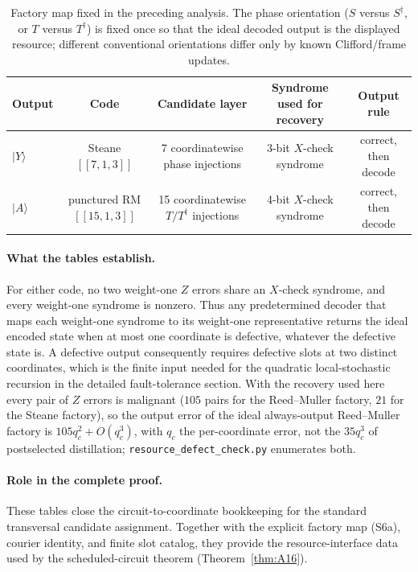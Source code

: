 \documentclass[aps,prx,reprint,superscriptaddress,nofootinbib,floatfix,longbibliography]{revtex4-2}
\theoremstyle{definition}
\begin{document}
\begin{table}[t]
\caption{Factory map fixed in the preceding analysis.  The phase orientation ($S$ versus $S^\dagger$, or $T$ versus $T^\dagger$) is fixed once so that the ideal decoded output is the displayed resource; different conventional orientations differ only by known Clifford/frame updates.}
\label{tab:factory-map}
\centering
\begin{tabular}{@{}l c c c c@{}}
\toprule
Output & Code & Candidate layer & Syndrome used for recovery & Output rule \\
\midrule
$|Y\rangle$ & Steane $[[7,1,3]]$ & 7 coordinatewise phase injections & 3-bit $X$-check syndrome & correct, then decode \\
$|A\rangle$ & punctured RM $[[15,1,3]]$ & 15 coordinatewise $T/T^\dagger$ injections & 4-bit $X$-check syndrome & correct, then decode \\
\bottomrule
\end{tabular}
\end{table}

\paragraph{What the tables establish.}
For either code, no two weight-one $Z$ errors share an $X$-check syndrome, and every weight-one syndrome is nonzero.  Thus any predetermined decoder that maps each weight-one syndrome to its weight-one representative returns the ideal encoded state when at most one coordinate is defective, whatever the defective state is.  A defective output consequently requires defective slots at two distinct coordinates, which is the finite input needed for the quadratic local-stochastic recursion in the detailed fault-tolerance section.  With the recovery used here every pair of $Z$ errors is malignant ($105$ pairs for the Reed--Muller factory, $21$ for the Steane factory), so the output error of the ideal always-output Reed--Muller factory is $105q_c^2+O(q_c^3)$, with $q_c$ the per-coordinate error, not the $35q_c^3$ of postselected distillation; \texttt{resource\_defect\_check.py} enumerates both.

\paragraph{Role in the complete proof.}
These tables close the circuit-to-coordinate bookkeeping for the standard transversal candidate assignment.  Together with the explicit factory map (S6a), courier identity, and finite slot catalog, they provide the resource-interface data used by the scheduled-circuit theorem (Theorem~\ref{thm:A16}).
\end{document}
